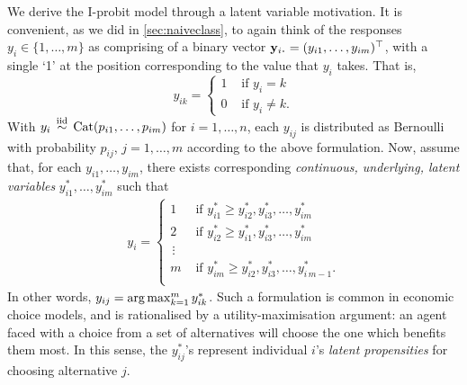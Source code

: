 We derive the I-probit model through a latent variable motivation.
It is convenient, as we did in \cref{sec:naiveclass}, to again think of the responses $y_i \in \{1,\dots,m\} $ as comprising of a binary vector $\by_{i \bigcdot} = (y_{i1},\dots,y_{im})^\top$, with a single `1' at the position corresponding to the value that $y_i$ takes. 
That is,
\[
  y_{ik} =
  \begin{cases}
    1 &\text{ if } y_i = k \\
    0 &\text{ if } y_i \neq k.
  \end{cases}
\]
With $y_i\,\overset{\text{iid}}{\sim}\,\operatorname{Cat}(p_{i1},\dots,p_{im})$ for $i=1,\dots,n$, each $y_{ij}$ is distributed as Bernoulli with probability $p_{ij}$, $j=1,\dots,m$ according to the above formulation. 
Now, assume that, for each $y_{i1}, \dots, y_{im}$, there exists corresponding \emph{continuous, underlying, latent variables} $y_{i1}^*, \dots, y_{im}^*$ such that
\begin{align}\label{eq:latentmodel}
  y_i =
  \begin{cases}
    1 &\text{ if } y_{i1}^* \geq y_{i2}^*, y_{i3}^*, \dots, y_{im}^* \\
    2 &\text{ if } y_{i2}^* \geq y_{i1}^*, y_{i3}^*, \dots, y_{im}^* \\
    \,\vdots \\
    m &\text{ if } y_{im}^* \geq y_{i2}^*, y_{i3}^*, \dots, y_{i\,m-1}^*. \\
  \end{cases}  
\end{align}
In other words, 
$y_{ij} = \operatorname*{arg\,max}_{k=1}^m y_{ik}^*$.
Such a formulation is common in economic choice models, and is rationalised by a utility-maximisation argument: an agent faced with a choice from a set of alternatives will choose the one which benefits them most.
In this sense, the $y_{ij}^*$'s represent individual $i$'s \emph{latent propensities} for choosing alternative $j$.

